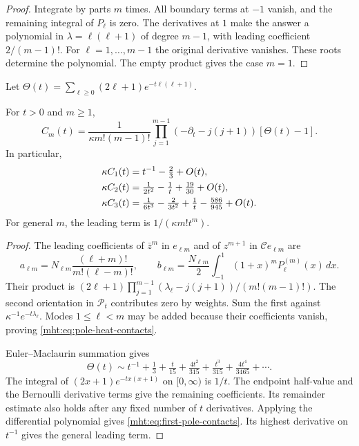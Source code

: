 \begin{proof}
Integrate by parts $m$ times. All boundary terms at $-1$
vanish, and the remaining integral of $P_\ell$ is zero.
The derivatives at $1$ make the answer a polynomial in
$\lambda=\ell(\ell+1)$ of degree $m-1$, with leading
coefficient $2/(m-1)!$. For $\ell=1,\ldots,m-1$ the original
derivative vanishes. These roots determine the polynomial.
The empty product gives the case $m=1$.
\end{proof}

Let $\Theta(t)=\sum_{\ell\geq0}(2\ell+1)e^{-t\ell(\ell+1)}$.

\begin{proposition}\label{mht:prop:pole-heat-contacts}
For $t>0$ and $m\geq1$,
\begin{equation}\label{mht:eq:pole-heat-contacts}
 C_m(t)=\frac1{\kappa m!(m-1)!}
   \prod_{j=1}^{m-1}(-\partial_t-j(j+1))[\Theta(t)-1].
\end{equation}
In particular,
\begin{align}
 \kappa C_1(t)&=t^{-1}-\tfrac23+O(t),\notag\\
 \kappa C_2(t)&=\tfrac1{2t^2}-\tfrac1t+\tfrac{19}{30}+O(t),\notag\\
 \kappa C_3(t)&=\tfrac1{6t^3}-\tfrac2{3t^2}+\tfrac1t
                       -\tfrac{586}{945}+O(t).
 \label{mht:eq:first-pole-contacts}
\end{align}
For general $m$, the leading term is $1/(\kappa m!t^m)$.
\end{proposition}

\begin{proof}
The leading coefficients of $\bar z^m$ in $e_{\ell m}$ and
of $z^{m+1}$ in $\mathcal Ce_{\ell m}$ are
\[
 a_{\ell m}=N_{\ell m}\frac{(\ell+m)!}{m!(\ell-m)!},
 \qquad
 b_{\ell m}=\frac{N_{\ell m}}2
             \int_{-1}^{1}(1+x)^mP_\ell^{(m)}(x)\,dx.
\]
Their product is
$(2\ell+1)\prod_{j=1}^{m-1}(\lambda_\ell-j(j+1))/(m!(m-1)!)$.
The second orientation in $\mathcal P_t$ contributes zero by
weights. Sum the first against $\kappa^{-1}e^{-t\lambda_\ell}$.
Modes $1\leq\ell<m$ may be added because their coefficients
vanish, proving \eqref{mht:eq:pole-heat-contacts}.

Euler--Maclaurin summation gives
\[
 \Theta(t)\sim t^{-1}+\tfrac13+\tfrac{t}{15}
                   +\tfrac{4t^2}{315}+\tfrac{t^3}{315}
                   +\tfrac{4t^4}{3465}+\cdots.
\]
The integral of $(2x+1)e^{-tx(x+1)}$ on $[0,\infty)$ is
$1/t$. The endpoint half-value and the Bernoulli derivative
terms give the remaining coefficients. Its remainder estimate
also holds after any fixed number of $t$ derivatives.
Applying the differential polynomial gives
\eqref{mht:eq:first-pole-contacts}. Its highest derivative on
$t^{-1}$ gives the general leading term.
\end{proof}

